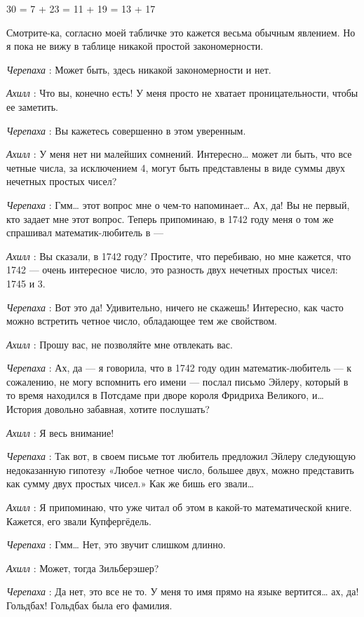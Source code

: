 \documentclass[../main.tex]{subfiles}
\begin{document}
\begin{dialogue}
30 = 7 + 23 = 11 + 19 = 13 + 17

Смотрите-ка, согласно моей табличке это кажется весьма обычным явлением. Но я пока не вижу в таблице никакой простой закономерности.

\emph{Черепаха} : Может быть, здесь никакой закономерности и нет.

\emph{Ахилл} : Что вы, конечно есть! У меня просто не хватает проницательности, чтобы ее заметить.

\emph{Черепаха} : Вы кажетесь совершенно в этом уверенным.

\emph{Ахилл} : У меня нет ни малейших сомнений. Интересно\ldots{} может ли быть, что все четные числа, за исключением 4, могут быть представлены в виде суммы двух нечетных простых чисел?

\emph{Черепаха} : Гмм\ldots{} этот вопрос мне о чем-то напоминает\ldots{} Ах, да! Вы не первый, кто задает мне этот вопрос. Теперь припоминаю, в 1742 году меня о том же спрашивал математик-любитель в ---

\emph{Ахилл} : Вы сказали, в 1742 году? Простите, что перебиваю, но мне кажется, что 1742 --- очень интересное число, это разность двух нечетных простых чисел: 1745 и 3.

\emph{Черепаха} : Вот это да! Удивительно, ничего не скажешь! Интересно, как часто можно встретить четное число, обладающее тем же свойством.

\emph{Ахилл} : Прошу вас, не позволяйте мне отвлекать вас.

\emph{Черепаха} : Ах, да --- я говорила, что в 1742 году один математик-любитель --- к сожалению, не могу вспомнить его имени --- послал письмо Эйлеру, который в то время находился в Потсдаме при дворе короля Фридриха Великого, и\ldots{} История довольно забавная, хотите послушать?

\emph{Ахилл} : Я весь внимание!

\emph{Черепаха} : Так вот, в своем письме тот любитель предложил Эйлеру следующую недоказанную гипотезу «Любое четное число, большее двух, можно представить как сумму двух простых чисел.» Как же бишь его звали\ldots{}

\emph{Ахилл} : Я припоминаю, что уже читал об этом в какой-то математической книге. Кажется, его звали Купфергёдель.

\emph{Черепаха} : Гмм\ldots{} Нет, это звучит слишком длинно.

\emph{Ахилл} : Может, тогда Зильберэшер?

\emph{Черепаха} : Да нет, это все не то. У меня то имя прямо на языке вертится\ldots{} ах, да! Гольдбах! Гольдбах была его фамилия.


\end{dialogue}
\end{document}
